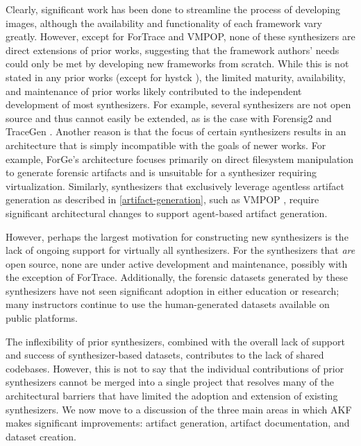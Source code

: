 \documentclass[final,5p,times,twocolumn]{elsarticle}
\begin{document}
Clearly, significant work has been done to streamline the process of
developing images, although the availability and functionality of each
framework vary greatly. However, except for ForTrace and VMPOP, none of
these synthesizers are direct extensions of prior works, suggesting that
the framework authors' needs could only be met by developing new
frameworks from scratch. While this is not stated in any prior works
(except for hystck \citep{gobelNovelApproachGenerating2020}), the
limited maturity, availability, and maintenance of prior works likely
contributed to the independent development of most synthesizers. For
example, several synthesizers are not open source and thus cannot easily
be extended, as is the case with Forensig2
\citep{mochForensicImageGenerator2009} and TraceGen
\citep{duTraceGenUserActivity2021}. Another reason is that the focus
of certain synthesizers results in an architecture that is simply
incompatible with the goals of newer works. For example, ForGe's
architecture \citep{vistiAutomaticCreationComputer2015} focuses
primarily on direct filesystem manipulation to generate forensic
artifacts and is unsuitable for a synthesizer requiring virtualization.
Similarly, synthesizers that exclusively leverage agentless artifact
generation as described in \autoref{artifact-generation}, such as
VMPOP \citep{parkTREDEVMPOPCultivating2018}, require significant
architectural changes to support agent-based artifact generation.

However, perhaps the largest motivation for constructing new
synthesizers is the lack of ongoing support for virtually all
synthesizers. For the synthesizers that \emph{are} open source, none are
under active development and maintenance, possibly with the exception of
ForTrace. Additionally, the forensic datasets generated by these
synthesizers have not seen significant adoption in either education or
research; many instructors continue to use the human-generated datasets
available on public platforms.

The inflexibility of prior synthesizers, combined with the overall lack
of support and success of synthesizer-based datasets, contributes to the
lack of shared codebases. However, this is not to say that the
individual contributions of prior synthesizers cannot be merged into a
single project that resolves many of the architectural barriers that
have limited the adoption and extension of existing synthesizers. We now
move to a discussion of the three main areas in which AKF makes
significant improvements: artifact generation, artifact documentation,
and dataset creation.
\end{document}
